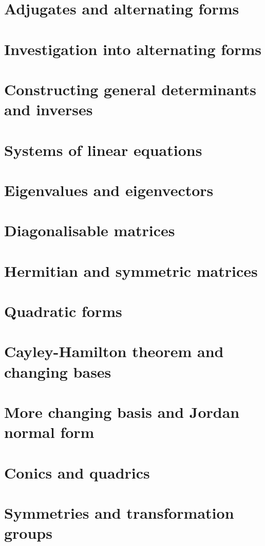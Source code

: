 \documentclass{article}
\begin{document}
\section{Adjugates and alternating forms}

\section{Investigation into alternating forms}

\section{Constructing general determinants and inverses}

\section{Systems of linear equations}

\section{Eigenvalues and eigenvectors}

\section{Diagonalisable matrices}

\section{Hermitian and symmetric matrices}

\section{Quadratic forms}

\section{Cayley-Hamilton theorem and changing bases}

\section{More changing basis and Jordan normal form}

\section{Conics and quadrics}

\section{Symmetries and transformation groups}

\end{document}
